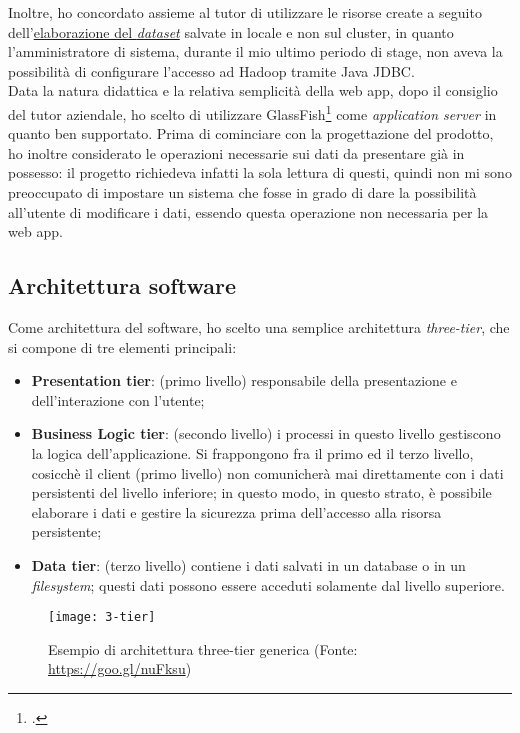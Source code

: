 Inoltre, ho concordato assieme al tutor di utilizzare le risorse create a seguito dell'\hyperref[dataset]{elaborazione del \textit{dataset}} salvate in locale e non sul \gls{cluster}, in quanto l'amministratore di sistema, durante il mio ultimo periodo di stage, non aveva la possibilità di configurare l'accesso ad Hadoop tramite \gls{Java JDBC}. \\
Data la natura didattica e la relativa semplicità della \gls{web app}, dopo il consiglio del tutor aziendale, ho scelto di utilizzare GlassFish\footcite{https://javaee.github.io/glassfish/} come \textit{application server} in quanto ben supportato.
Prima di cominciare con la progettazione del prodotto, ho inoltre considerato le operazioni necessarie sui dati da presentare già in possesso: il progetto richiedeva infatti la sola lettura di questi, quindi non mi sono preoccupato di impostare un sistema che fosse in grado di dare la possibilità all'utente di modificare i dati, essendo questa operazione non necessaria per la \gls{web app}.

\subsection{Architettura software}
Come architettura del software, ho scelto una semplice architettura \textit{three-tier}, che si compone di tre elementi principali:
\begin{itemize}
	\item \textbf{Presentation tier}: (primo livello) responsabile della presentazione e dell'interazione con l'utente; 
	\item \textbf{Business Logic tier}: (secondo livello) i processi in questo livello gestiscono la logica dell'applicazione. Si frappongono fra il primo ed il terzo livello, cosicchè il client (primo livello) non comunicherà mai direttamente con i dati persistenti del livello inferiore; in questo modo, in questo strato, è possibile elaborare i dati e gestire la sicurezza prima dell'accesso alla risorsa persistente;
	\item \textbf{Data tier}: (terzo livello) contiene i dati salvati in un database o in un \textit{filesystem}; questi dati possono essere acceduti solamente dal livello superiore.
\end{itemize}

\begin{figure}[!h]
	\centering
	\texttt{[image: 3-tier]}
	\caption{Esempio di architettura three-tier generica (Fonte: \href{https://goo.gl/nuFksu}{https://goo.gl/nuFksu})}
\end{figure}

